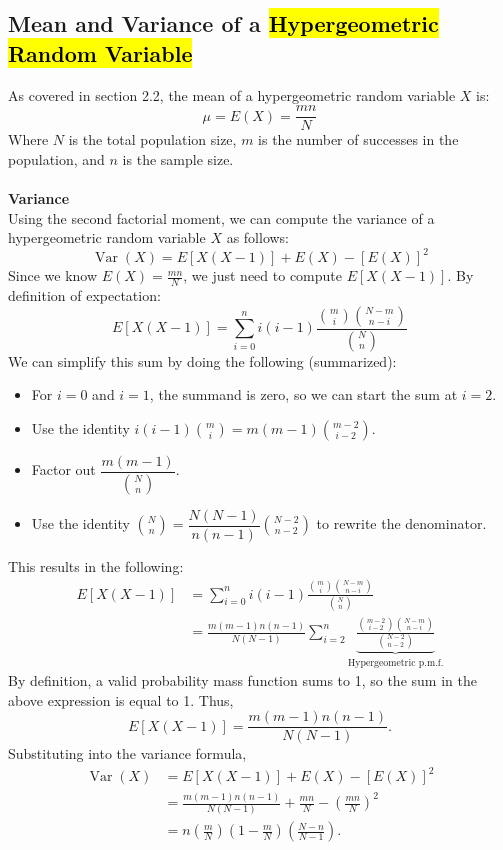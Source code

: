 ﻿\documentclass[12pt]{article}
\begin{document}
\subsection*{Mean and Variance of a \hl{Hypergeometric Random Variable}}
As covered in section 2.2, the mean of a hypergeometric random variable $X$ is:
\[\boxed{\mu = E(X) = \frac{mn}{N}}\]
Where $N$ is the total population size, $m$ is the number of successes in the population, and $n$ is the sample size.\\\\
\textbf{Variance}\\
Using the second factorial moment, we can compute the variance of a hypergeometric random variable $X$ as follows:
\[\operatorname{Var}(X) = E[X(X-1)] + E(X) - [E(X)]^2\]
Since we know $E(X) = \frac{mn}{N}$, we just need to compute $E[X(X-1)]$. By definition of expectation:
\[
E[X(X-1)]=\sum_{i=0}^{n}i(i-1)\frac{\binom mi\binom{N-m}{n-i}}{\binom Nn}
\]
We can simplify this sum by doing the following (summarized):
\begin{itemize}
    \item For $i=0$ and $i=1$, the summand is zero, so we can start the sum at $i=2$.
    \item Use the identity
    $i(i-1)\binom{m}{i}=m(m-1)\binom{m-2}{i-2}$.
    \item Factor out $\dfrac{m(m-1)}{\binom{N}{n}}$.
    \item Use the identity
    $\binom{N}{n}=\dfrac{N(N-1)}{n(n-1)}\binom{N-2}{n-2}$
    to rewrite the denominator.
\end{itemize}
This results in the following:
\[
\begin{aligned}
E[X(X-1)]
&=\sum_{i=0}^{n}i(i-1)
\frac{\binom{m}{i}\binom{N-m}{n-i}}{\binom{N}{n}}\\[6pt]
&=\frac{m(m-1)n(n-1)}{N(N-1)}
\sum_{i=2}^{n}
\underbrace{
\frac{\binom{m-2}{i-2}\binom{N-m}{n-i}}
{\binom{N-2}{n-2}}
}_{\text{Hypergeometric p.m.f.}}
\end{aligned}
\]
By definition, a valid probability mass function sums to 1, so the sum in the above expression is equal to 1. Thus,
\[
E[X(X-1)]=\frac{m(m-1)n(n-1)}{N(N-1)}.
\]
Substituting into the variance formula,
\[
\begin{aligned}
\operatorname{Var}(X)
&=E[X(X-1)]+E(X)-[E(X)]^2\\[6pt]
&=\frac{m(m-1)n(n-1)}{N(N-1)}
+\frac{mn}{N}-\left(\frac{mn}{N}\right)^2\\[6pt]
&=\boxed{n\left(\frac{m}{N}\right)
\left(1-\frac{m}{N}\right)
\left(\frac{N-n}{N-1}\right)}.
\end{aligned}
\]
\end{document}
